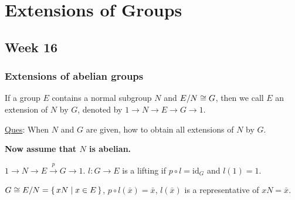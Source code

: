 \section{Extensions of Groups}
\subsection{Week 16}
\subsubsection{Extensions of abelian groups}

\begin{definition}
  If a group $E$ contains a normal subgroup $N$ and ${E}/{N} \cong G$,
  then we call $E$ an extension of $N$ by $G$, denoted by
  $1 \to N \to E \to G \to 1$.
\end{definition}

\underline{Ques}: When $N$ and $G$ are given, how to obtain all extensions of
$N$ by $G$.

{\bf Now assume that $N$ is abelian.}

\begin{definition}
  $1 \to N \to E \xrightarrow{p} G \to 1$.
  $l: G \to E $ is a lifting if $p \circ l = \text{id}_G$ and $l(1) = 1$.
\end{definition}

\begin{remark}
  $G \cong {E}/{N} = \{\, xN \mid x \in E \,\}$,
  $p \circ l(\bar{x}) = \bar{x}$, $l(\bar{x})$ is a representative of $xN = \bar{x}$.
\end{remark}


